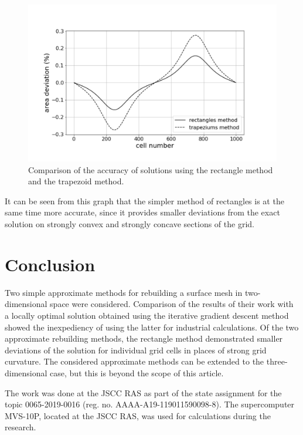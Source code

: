 \documentclass[
11pt,%
tightenlines,%
twoside,%
onecolumn,%
nofloats,%
nobibnotes,%
nofootinbib,%
superscriptaddress,%
noshowpacs,%
centertags]%
{revtex4}
\begin{document}
\begin{figure}[h]
\setcaptionmargin{5mm}
\onelinecaptionstrue
\includegraphics[width=1.0\textwidth]{pics/graphic.pdf}
\caption{Comparison of the accuracy of solutions using the rectangle method and the trapezoid method.}
\label{fig:graphic}
\end{figure}

It can be seen from this graph that the simpler method of rectangles is at the same time more accurate, since it provides smaller deviations from the exact solution on strongly convex and strongly concave sections of the grid.

\section{Conclusion}

Two simple approximate methods for rebuilding a surface mesh in two-dimensional space were considered.
Comparison of the results of their work with a locally optimal solution obtained using the iterative gradient descent method showed the inexpediency of using the latter for industrial calculations.
Of the two approximate rebuilding methods, the rectangle method demonstrated smaller deviations of the solution for individual grid cells in places of strong grid curvature.
The considered approximate methods can be extended to the three-dimensional case, but this is beyond the scope of this article.

\begin{acknowledgments}
The work was done at the JSCC RAS as part of the state assignment for the topic 0065-2019-0016 (reg. no. AAAA-A19-119011590098-8). The supercomputer MVS-10P, located at the JSCC RAS, was used for calculations during the research.
\end{acknowledgments}
\end{document}
